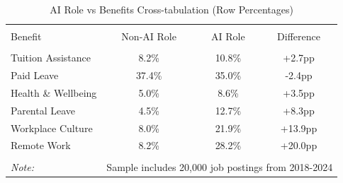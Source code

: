 \begin{table}[!htbp] \centering
\caption{AI Role vs Benefits Cross-tabulation (Row Percentages)}
\label{tab:ai_benefits_crosstab}
\begin{tabular}{lccc}
\\[-1.8ex]\hline
\hline \\[-1.8ex]
Benefit & Non-AI Role & AI Role & Difference \\
\hline \\[-1.8ex]
Tuition Assistance & 8.2\% & 10.8\% & +2.7pp \\
Paid Leave & 37.4\% & 35.0\% & -2.4pp \\
Health \& Wellbeing & 5.0\% & 8.6\% & +3.5pp \\
Parental Leave & 4.5\% & 12.7\% & +8.3pp \\
Workplace Culture & 8.0\% & 21.9\% & +13.9pp \\
Remote Work & 8.2\% & 28.2\% & +20.0pp \\
\hline
\hline \\[-1.8ex]
\textit{Note:} & \multicolumn{3}{r}{Sample includes 20,000 job postings from 2018-2024} \\
\end{tabular}
\end{table}
